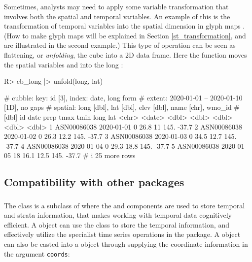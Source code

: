 \documentclass[
  shortnames]{jss}
\begin{document}
Sometimes, analysts may need to apply some variable transformation that involves both the spatial and temporal variables. An example of this is the transformation of temporal variables into the spatial dimension in glyph maps \citep{Wickham2012-yr}. (How to make glyph maps will be explained in Section \ref{st_transformation}, and are illustrated in the second example.) This type of operation can be seen as flattening, or \emph{unfolding}, the cube into a 2D data frame. Here the function  moves the spatial variables  and  into the long :

\begin{CodeChunk}
\begin{CodeInput}
R> cb_long |> unfold(long, lat)
\end{CodeInput}
\begin{CodeOutput}
# cubble:  key: id [3], index: date, long form
# extent:  2020-01-01 -- 2020-01-10 [1D], no gaps
# spatial: long [dbl], lat [dbl], elev [dbl], name [chr], wmo_id
#   [dbl]
  id          date        prcp  tmax  tmin  long   lat
  <chr>       <date>     <dbl> <dbl> <dbl> <dbl> <dbl>
1 ASN00086038 2020-01-01     0  26.8  11    145. -37.7
2 ASN00086038 2020-01-02     0  26.3  12.2  145. -37.7
3 ASN00086038 2020-01-03     0  34.5  12.7  145. -37.7
4 ASN00086038 2020-01-04     0  29.3  18.8  145. -37.7
5 ASN00086038 2020-01-05    18  16.1  12.5  145. -37.7
# i 25 more rows
\end{CodeOutput}
\end{CodeChunk}

\hypertarget{compatibility-with-other-packages}{%
\subsection{Compatibility with other packages}\label{compatibility-with-other-packages}}

\subsubsection[]{}

The  class is a subclass of  where the  and  components are used to store temporal and strata information, that makes working with temporal data cognitively efficient. A  object can use the  class to store the temporal information, and effectively utilize the specialist time series operations in the  package. A  object can also be casted into a  object through supplying the coordinate information in the argument \texttt{coords}:
\end{document}
